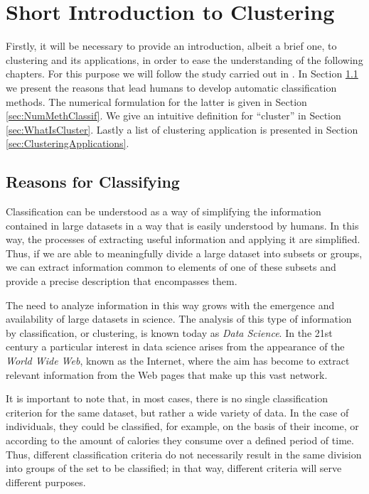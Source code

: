 
\chapter{Short Introduction to Clustering}\label{ch:IntroClustering}

Firstly, it will be necessary to provide an introduction, albeit a brief one, to clustering and its applications, in order to ease the understanding of the following chapters. For this purpose we will follow the study carried out in \cite{Everitt:2009:CA:1538772}. In Section  \ref{sec:ReasonsClassif} we present the reasons that lead humans to develop automatic classification methods. The numerical formulation for the latter is given in Section \ref{sec:NumMethClassif}. We give an intuitive definition for ``cluster'' in Section \ref{sec:WhatIsCluster}. Lastly a list of clustering application is presented in Section \ref{sec:ClusteringApplications}.

\section{Reasons for Classifying} \label{sec:ReasonsClassif}

Classification can be understood as a way of simplifying the information contained in large datasets in a way that is easily understood by humans. In this way, the processes of extracting useful information and applying it are simplified. Thus, if we are able to meaningfully divide a large dataset into subsets or groups, we can extract information common to elements of one of these subsets and provide a precise description that encompasses them.

The need to analyze information in this way grows with the emergence and availability of large datasets in science. The analysis of this type of information by classification, or clustering, is known today as \textit{Data Science}. In the 21st century a particular interest in data science arises from the appearance of the \textit{World Wide Web}, known as the Internet, where the aim has become to extract relevant information from the Web pages that make up this vast network.

It is important to note that, in most cases, there is no single classification criterion for the same dataset, but rather a wide variety of data. In the case of individuals, they could be classified, for example, on the basis of their income, or according to the amount of calories they consume over a defined period of time. Thus, different classification criteria do not necessarily result in the same division into groups of the set to be classified; in that way, different criteria will serve different purposes.

